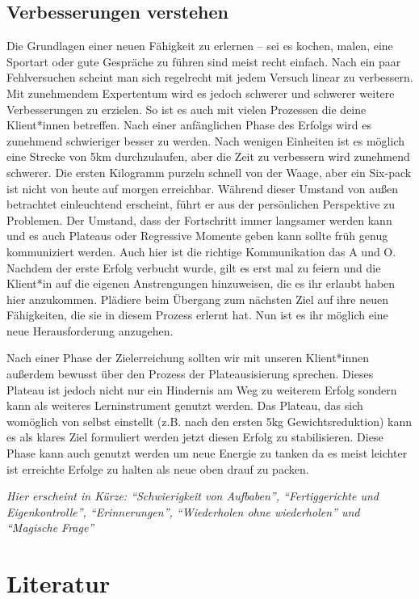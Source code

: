 \documentclass[
  letterpaper,
  DIV=11,
  numbers=noendperiod]{scrreprt}
\begin{document}
\subsection{Verbesserungen verstehen}\label{verbesserungen-verstehen}

Die Grundlagen einer neuen Fähigkeit zu erlernen -- sei es kochen,
malen, eine Sportart oder gute Gespräche zu führen sind meist recht
einfach. Nach ein paar Fehlversuchen scheint man sich regelrecht mit
jedem Versuch linear zu verbessern. Mit zunehmendem Expertentum wird es
jedoch schwerer und schwerer weitere Verbesserungen zu erzielen. So ist
es auch mit vielen Prozessen die deine Klient*innen betreffen. Nach
einer anfänglichen Phase des Erfolgs wird es zunehmend schwieriger
besser zu werden. Nach wenigen Einheiten ist es möglich eine Strecke von
5km durchzulaufen, aber die Zeit zu verbessern wird zunehmend schwerer.
Die ersten Kilogramm purzeln schnell von der Waage, aber ein Six-pack
ist nicht von heute auf morgen erreichbar. Während dieser Umstand von
außen betrachtet einleuchtend erscheint, führt er aus der persönlichen
Perspektive zu Problemen. Der Umstand, dass der Fortschritt immer
langsamer werden kann und es auch Plateaus oder Regressive Momente geben
kann sollte früh genug kommuniziert werden. Auch hier ist die richtige
Kommunikation das A und O. Nachdem der erste Erfolg verbucht wurde, gilt
es erst mal zu feiern und die Klient*in auf die eigenen Anstrengungen
hinzuweisen, die es ihr erlaubt haben hier anzukommen. Plädiere beim
Übergang zum nächsten Ziel auf ihre neuen Fähigkeiten, die sie in diesem
Prozess erlernt hat. Nun ist es ihr möglich eine neue Herausforderung
anzugehen.

Nach einer Phase der Zielerreichung sollten wir mit unseren Klient*innen
außerdem bewusst über den Prozess der Plateausisierung sprechen. Dieses
Plateau ist jedoch nicht nur ein Hindernis am Weg zu weiterem Erfolg
sondern kann als weiteres Lerninstrument genutzt werden. Das Plateau,
das sich womöglich von selbst einstellt (z.B. nach den ersten 5kg
Gewichtsreduktion) kann es als klares Ziel formuliert werden jetzt
diesen Erfolg zu stabilisieren. Diese Phase kann auch genutzt werden um
neue Energie zu tanken da es meist leichter ist erreichte Erfolge zu
halten als neue oben drauf zu packen.

{\emph{Hier erscheint in Kürze: ``Schwierigkeit von Aufbaben'',
``Fertiggerichte und Eigenkontrolle'', ``Erinnerungen'', ``Wiederholen
ohne wiederholen'' und ``Magische Frage''}}

\section{Literatur}\label{literatur-8}
\end{document}
